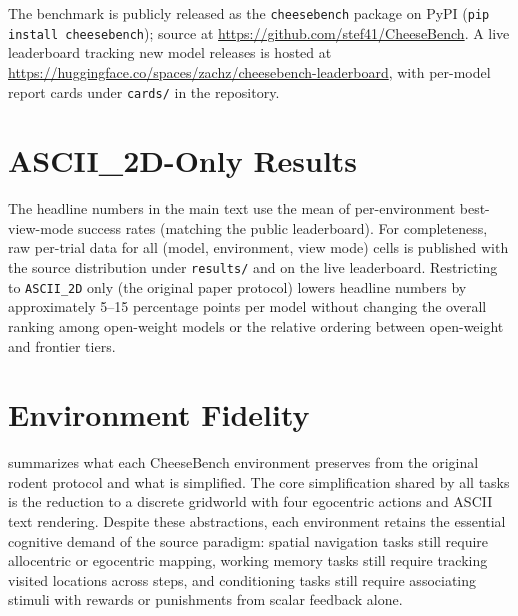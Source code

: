 \documentclass[letterpaper]{article}
\begin{document}
The benchmark is publicly released as the \texttt{cheesebench} package on PyPI (\texttt{pip install cheesebench}); source at \url{https://github.com/stef41/CheeseBench}. A live leaderboard tracking new model releases is hosted at \url{https://huggingface.co/spaces/zachz/cheesebench-leaderboard}, with per-model report cards under \texttt{cards/} in the repository.






\appendix
\section{ASCII\_2D-Only Results}
\label{app:ascii2d}

The headline numbers in the main text use the mean of per-environment best-view-mode success rates (matching the public leaderboard). For completeness, raw per-trial data for all (model, environment, view mode) cells is published with the source distribution under \texttt{results/} and on the live leaderboard. Restricting to \texttt{ASCII\_2D} only (the original paper protocol) lowers headline numbers by approximately 5--15 percentage points per model without changing the overall ranking among open-weight models or the relative ordering between open-weight and frontier tiers.

\section{Environment Fidelity}
\label{app:fidelity}

 summarizes what each CheeseBench environment preserves from the original rodent protocol and what is simplified.
The core simplification shared by all tasks is the reduction to a discrete gridworld with four egocentric actions and ASCII text rendering.
Despite these abstractions, each environment retains the essential cognitive demand of the source paradigm: spatial navigation tasks still require allocentric or egocentric mapping, working memory tasks still require tracking visited locations across steps, and conditioning tasks still require associating stimuli with rewards or punishments from scalar feedback alone.
\end{document}
